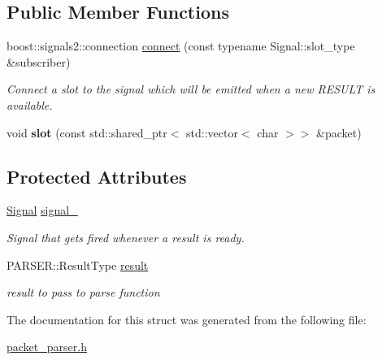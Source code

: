 \subsection*{Public Member Functions}
\begin{DoxyCompactItemize}
\item 
\hypertarget{structquanergy_1_1client_1_1PacketParserModule_aef1a64e8ab6d3eb3aaf79041794d2137}{boost\-::signals2\-::connection \hyperlink{structquanergy_1_1client_1_1PacketParserModule_aef1a64e8ab6d3eb3aaf79041794d2137}{connect} (const typename Signal\-::slot\-\_\-type \&subscriber)}\label{structquanergy_1_1client_1_1PacketParserModule_aef1a64e8ab6d3eb3aaf79041794d2137}

\begin{DoxyCompactList}\small\item\em Connect a slot to the signal which will be emitted when a new R\-E\-S\-U\-L\-T is available. \end{DoxyCompactList}\item 
\hypertarget{structquanergy_1_1client_1_1PacketParserModule_aec3b3652906e440cc226b7091e6e79d3}{void {\bfseries slot} (const std\-::shared\-\_\-ptr$<$ std\-::vector$<$ char $>$$>$ \&packet)}\label{structquanergy_1_1client_1_1PacketParserModule_aec3b3652906e440cc226b7091e6e79d3}

\end{DoxyCompactItemize}
\subsection*{Protected Attributes}
\begin{DoxyCompactItemize}
\item 
\hypertarget{structquanergy_1_1client_1_1PacketParserModule_a690ab0f8b14f9205750c634bdfb62c9c}{\hyperlink{structquanergy_1_1client_1_1PacketParserModule_a27105b55007e3ff6713d7775dbac2b6e}{Signal} \hyperlink{structquanergy_1_1client_1_1PacketParserModule_a690ab0f8b14f9205750c634bdfb62c9c}{signal\-\_\-}}\label{structquanergy_1_1client_1_1PacketParserModule_a690ab0f8b14f9205750c634bdfb62c9c}

\begin{DoxyCompactList}\small\item\em Signal that gets fired whenever a result is ready. \end{DoxyCompactList}\item 
\hypertarget{structquanergy_1_1client_1_1PacketParserModule_adaf4a0cf800ff5c48c79ff865c442f8e}{P\-A\-R\-S\-E\-R\-::\-Result\-Type \hyperlink{structquanergy_1_1client_1_1PacketParserModule_adaf4a0cf800ff5c48c79ff865c442f8e}{result}}\label{structquanergy_1_1client_1_1PacketParserModule_adaf4a0cf800ff5c48c79ff865c442f8e}

\begin{DoxyCompactList}\small\item\em result to pass to parse function \end{DoxyCompactList}\end{DoxyCompactItemize}


The documentation for this struct was generated from the following file\-:\begin{DoxyCompactItemize}
\item 
\hyperlink{packet__parser_8h}{packet\-\_\-parser.\-h}\end{DoxyCompactItemize}
